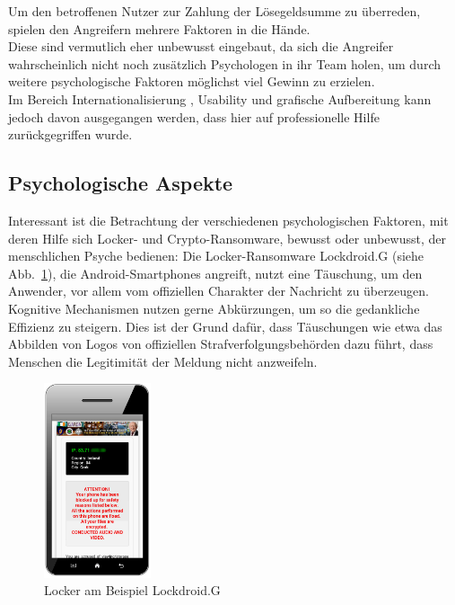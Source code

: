 Um den betroffenen Nutzer zur Zahlung der Lösegeldsumme zu überreden, spielen den Angreifern mehrere Faktoren in die Hände. \\
Diese sind vermutlich eher unbewusst eingebaut, da sich die Angreifer wahrscheinlich nicht noch zusätzlich Psychologen in ihr Team holen, um durch weitere psychologische Faktoren möglichst viel Gewinn zu erzielen. \\
Im Bereich Internationalisierung \cite{faktoren:l18n}, Usability und grafische Aufbereitung \cite{faktoren:grafik} \cite{evolution} kann jedoch davon ausgegangen werden, dass hier auf professionelle Hilfe zurückgegriffen wurde.

\subsection{Psychologische Aspekte}

Interessant ist die Betrachtung der verschiedenen psychologischen Faktoren, mit deren Hilfe sich Locker- und Crypto-Ransomware, bewusst oder unbewusst, der menschlichen Psyche bedienen:
Die Locker-Ransomware \glqq Lockdroid.G\grqq{} (siehe Abb.~\ref{fig:lockdroid}), die Android-Smartphones angreift, nutzt eine Täuschung, um den Anwender, vor allem vom offiziellen Charakter der Nachricht zu überzeugen.\\
Kognitive Mechanismen nutzen gerne Abkürzungen, um so die gedankliche Effizienz zu steigern. Dies ist der Grund dafür, dass Täuschungen wie etwa das Abbilden von Logos von offiziellen Strafverfolgungsbehörden dazu führt, dass Menschen die Legitimität der Meldung nicht anzweifeln. 

\begin{figure}[h]
  \centering
  \includegraphics[width=0.28\textwidth]{img/android_locker.png}
  \caption{Locker am Beispiel \glqq Lockdroid.G\grqq{} \cite{evolution}}
  \label{fig:lockdroid}
\end{figure}

